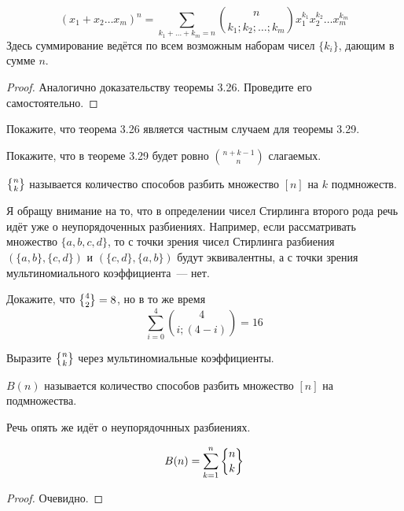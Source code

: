 \begin{thm}
$$(x_1+x_2\ldots x_m)^n = \sum_{k_1+\ldots + k_m = n}{n\choose k_1;k_2;\ldots;k_m}x_1^{k_1}x_2^{k_2}\ldots x_m^{k_m}$$
Здесь суммирование ведётся по всем возможным наборам чисел $\{k_i\}$, дающим в сумме $n$.
\end{thm}
\begin{proof}
Аналогично доказательству теоремы 3.26. Проведите его самостоятельно.
\end{proof}

\begin{exercise}
Покажите, что теорема 3.26 является частным случаем для теоремы 3.29.
\end{exercise}

\begin{exercise}
Покажите, что в теореме 3.29 будет ровно $n + k - 1 \choose n$ слагаемых.
\end{exercise}

\begin{definition}
 $\sstirling{n}{k}$ называется количество способов разбить множество $[n]$ на $k$ подмножеств.
\end{definition}

Я обращу внимание на то, что в определении чисел Стирлинга второго рода речь идёт уже о неупорядоченных разбиениях. Например, если рассматривать множество $\{a, b, c, d\}$, то с точки зрения чисел Стирлинга разбиения $(\{a, b\}, \{c, d\})$ и $(\{c, d\}, \{a, b\})$ будут эквивалентны, а с точки зрения мультиномиального коэффициента~— нет.

\begin{exercise}
Докажите, что $\sstirling{4}{2} = 8$, но в то же время
$$\sum_{i=0}^4 {4\choose i;(4-i)} = 16$$
\end{exercise}

\begin{exercise}
Выразите $\sstirling{n}{k}$ через мультиномиальные коэффициенты.
\end{exercise}

\begin{definition}
 $B(n)$ называется количество способов разбить множество $[n]$ на подмножества.
\end{definition}

Речь опять же идёт о неупорядочнных разбиениях.

\begin{thm}
$$B(n) = \sum_{k=1}^n\sstirling{n}{k}$$
\end{thm}
\begin{proof}
Очевидно.
\end{proof}

